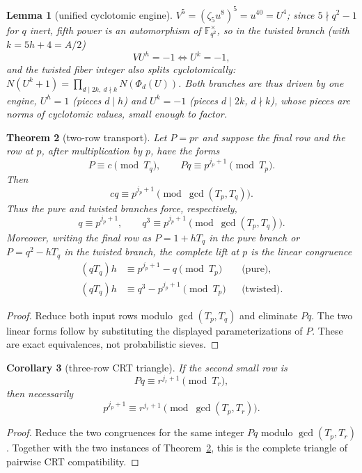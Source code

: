 \documentclass[11pt]{amsart}
\newtheorem{theorem}{Theorem}[section]
\newtheorem{lemma}[theorem]{Lemma}
\newtheorem{corollary}[theorem]{Corollary}
\theoremstyle{definition}
\theoremstyle{remark}
\newcommand{\F}{\mathbb{F}}
\begin{document}
\begin{lemma}[unified cyclotomic engine]\label{lem:engine}
$V^5 = (\zeta_5 u^8)^5 = u^{40} = U^4$; since $5 \nmid q^2 - 1$ for $q$
inert, fifth power is an automorphism of $\F_{q^2}^\times$, so in the
twisted branch (with $k = 5h + 4 = A/2$)
\[
V U^h = -1 \iff U^{k} = -1,
\]
and the twisted fiber integer also splits cyclotomically:
$N(U^k + 1) = \prod_{d \mid 2k,\ d \nmid k} N(\Phi_d(U))$. Both branches
are thus driven by one engine, $U^h = 1$ (pieces $d \mid h$) and
$U^k = -1$ (pieces $d \mid 2k$, $d \nmid k$), whose pieces are norms of
cyclotomic values, small enough to factor.
\end{lemma}

\begin{theorem}[two-row transport]\label{thm:two-row-transport}
Let $P=p r$ and suppose the final row and the row at $p$, after
multiplication by $p$, have the forms
\[
 P\equiv c\pmod{T_q},
 \qquad
 Pq\equiv p^{j_p+1}\pmod{T_p}.
\]
Then
\[
 \boxed{cq\equiv p^{j_p+1}\pmod{\gcd(T_p,T_q)}}.
\]
Thus the pure and twisted branches force, respectively,
\[
 q\equiv p^{j_p+1},\qquad
 q^3\equiv p^{j_p+1}
 \pmod{\gcd(T_p,T_q)}.
\]
Moreover, writing the final row as $P=1+hT_q$ in the pure branch or
$P=q^2-hT_q$ in the twisted branch, the complete lift at $p$ is the
linear congruence
\[
\begin{aligned}
 (qT_q)h&\equiv p^{j_p+1}-q\pmod{T_p}
 &&\text{(pure)},\\
 (qT_q)h&\equiv q^3-p^{j_p+1}\pmod{T_p}
 &&\text{(twisted)}.
\end{aligned}
\]
\end{theorem}

\begin{proof}
Reduce both input rows modulo $\gcd(T_p,T_q)$ and eliminate $Pq$.
The two linear forms follow by substituting the displayed
parameterizations of $P$.  These are exact equivalences, not
probabilistic sieves.
\end{proof}

\begin{corollary}[three-row CRT triangle]\label{cor:three-row-triangle}
If the second small row is
\[
 Pq\equiv r^{j_r+1}\pmod{T_r},
\]
then necessarily
\[
\boxed{
p^{j_p+1}\equiv r^{j_r+1}
\pmod{\gcd(T_p,T_r)}.}
\]
\end{corollary}

\begin{proof}
Reduce the two congruences for the same integer \(Pq\) modulo
\(\gcd(T_p,T_r)\).  Together with the two instances of
Theorem~\ref{thm:two-row-transport}, this is the complete triangle of
pairwise CRT compatibility.
\end{proof}
\end{document}
